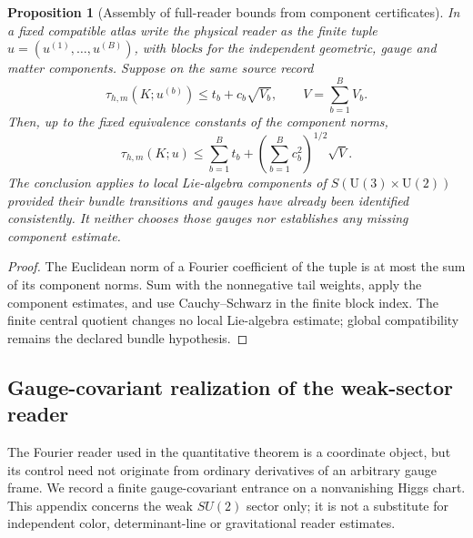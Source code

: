 \documentclass[11pt]{article}
\numberwithin{equation}{section}
\newtheorem{proposition}[proposition]{Proposition}
\theoremstyle{definition}
\theoremstyle{remark}
\newcommand{\U}{\mathrm U}
\begin{document}
\begin{proposition}[Assembly of full-reader bounds from component certificates]
\label{prop:component-reader}
In a fixed compatible atlas write the physical reader as the finite tuple
$u=(u^{(1)},\ldots,u^{(B)})$, with blocks for the independent geometric,
gauge and matter components.  Suppose on the same source record
\[
 \tau_{h,m}(K;u^{(b)})\le t_b+c_b\sqrt{V_b},\qquad
 V=\sum_{b=1}^BV_b.
\]
Then, up to the fixed equivalence constants of the component norms,
\begin{equation}
 \tau_{h,m}(K;u)
 \le\sum_{b=1}^Bt_b+
       \left(\sum_{b=1}^Bc_b^2\right)^{1/2}\sqrt V.
 \label{eq:component-reader}
\end{equation}
The conclusion applies to local Lie-algebra components of
$S(\U(3)\times\U(2))$ provided their bundle transitions and gauges have
already been identified consistently.  It neither chooses those gauges
nor establishes any missing component estimate.
\end{proposition}
\begin{proof}
The Euclidean norm of a Fourier coefficient of the tuple is at most the
sum of its component norms.  Sum with the nonnegative tail weights, apply
the component estimates, and use Cauchy--Schwarz in the finite block index.
The finite central quotient changes no local Lie-algebra estimate; global
compatibility remains the declared bundle hypothesis.
\end{proof}

\subsection{Gauge-covariant realization of the weak-sector reader}
\label{app:gauge-reader}

The Fourier reader used in the quantitative theorem is a coordinate object, but its control need not originate from ordinary derivatives of an arbitrary gauge frame.  We record a finite gauge-covariant entrance on a nonvanishing Higgs chart.  This appendix concerns the weak $SU(2)$ sector only; it is not a substitute for independent color, determinant-line or gravitational reader estimates.
\end{document}
